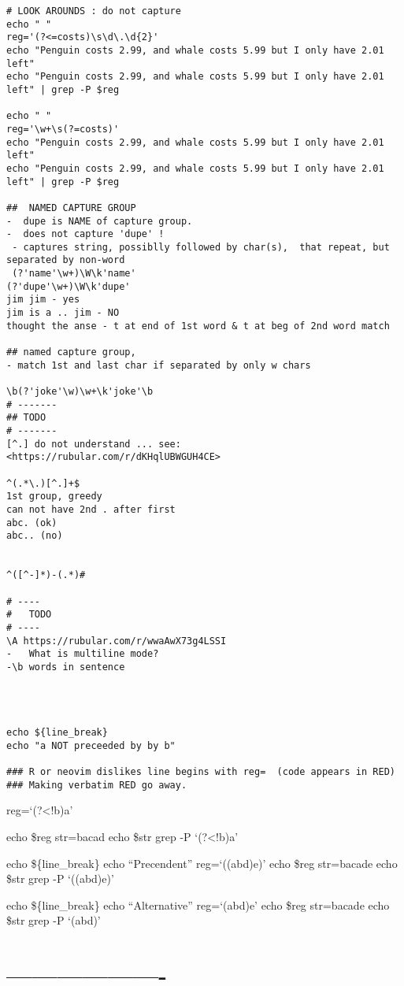 \documentclass[
  letterpaper,
  DIV=11,
  numbers=noendperiod]{scrartcl}
\begin{document}
\begin{verbatim}
# LOOK AROUNDS : do not capture
echo " " 
reg='(?<=costs)\s\d\.\d{2}'
echo "Penguin costs 2.99, and whale costs 5.99 but I only have 2.01 left"
echo "Penguin costs 2.99, and whale costs 5.99 but I only have 2.01 left" | grep -P $reg

echo " " 
reg='\w+\s(?=costs)'
echo "Penguin costs 2.99, and whale costs 5.99 but I only have 2.01 left"
echo "Penguin costs 2.99, and whale costs 5.99 but I only have 2.01 left" | grep -P $reg

##  NAMED CAPTURE GROUP
-  dupe is NAME of capture group.
-  does not capture 'dupe' !
 - captures string, possiblly followed by char(s),  that repeat, but separated by non-word
 (?'name'\w+)\W\k'name'
(?'dupe'\w+)\W\k'dupe'
jim jim - yes
jim is a .. jim - NO
thought the anse - t at end of 1st word & t at beg of 2nd word match

## named capture group, 
- match 1st and last char if separated by only w chars

\b(?'joke'\w)\w+\k'joke'\b
# -------
## TODO
# -------
[^.] do not understand ... see:
<https://rubular.com/r/dKHqlUBWGUH4CE>

^(.*\.)[^.]+$
1st group, greedy
can not have 2nd . after first
abc. (ok)
abc.. (no)


^([^-]*)-(.*)#

# ----
#   TODO
# ----
\A https://rubular.com/r/wwaAwX73g4LSSI
-   What is multiline mode?
-\b words in sentence




echo ${line_break}
echo "a NOT preceeded by by b"

### R or neovim dislikes line begins with reg=  (code appears in RED)
### Making verbatim RED go away.
\end{verbatim}

reg=`(?\textless!b)a'

echo \$reg str=bacad echo \$str \textbar{} grep -P `(?\textless!b)a'

echo \$\{line\_break\} echo ``Precendent'' reg=`((ab\textbar d)e)' echo
\$reg str=bacade echo \$str \textbar{} grep -P `((ab\textbar d)e)'

echo \$\{line\_break\} echo ``Alternative'' reg=`(ab\textbar d)e' echo
\$reg str=bacade echo \$str \textbar{} grep -P `(ab\textbar d)'

\section{-------------------}\label{section}
\end{document}
